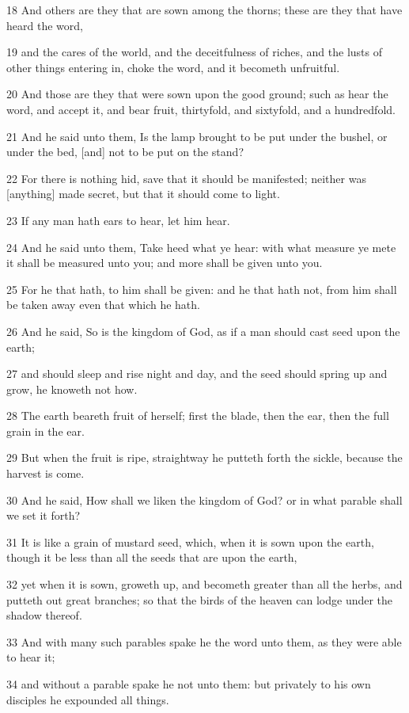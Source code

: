 \par 18 And others are they that are sown among the thorns; these are they that have heard the word,
\par 19 and the cares of the world, and the deceitfulness of riches, and the lusts of other things entering in, choke the word, and it becometh unfruitful.
\par 20 And those are they that were sown upon the good ground; such as hear the word, and accept it, and bear fruit, thirtyfold, and sixtyfold, and a hundredfold.
\par 21 And he said unto them, Is the lamp brought to be put under the bushel, or under the bed, [and] not to be put on the stand?
\par 22 For there is nothing hid, save that it should be manifested; neither was [anything] made secret, but that it should come to light.
\par 23 If any man hath ears to hear, let him hear.
\par 24 And he said unto them, Take heed what ye hear: with what measure ye mete it shall be measured unto you; and more shall be given unto you.
\par 25 For he that hath, to him shall be given: and he that hath not, from him shall be taken away even that which he hath.
\par 26 And he said, So is the kingdom of God, as if a man should cast seed upon the earth;
\par 27 and should sleep and rise night and day, and the seed should spring up and grow, he knoweth not how.
\par 28 The earth beareth fruit of herself; first the blade, then the ear, then the full grain in the ear.
\par 29 But when the fruit is ripe, straightway he putteth forth the sickle, because the harvest is come.
\par 30 And he said, How shall we liken the kingdom of God? or in what parable shall we set it forth?
\par 31 It is like a grain of mustard seed, which, when it is sown upon the earth, though it be less than all the seeds that are upon the earth,
\par 32 yet when it is sown, groweth up, and becometh greater than all the herbs, and putteth out great branches; so that the birds of the heaven can lodge under the shadow thereof.
\par 33 And with many such parables spake he the word unto them, as they were able to hear it;
\par 34 and without a parable spake he not unto them: but privately to his own disciples he expounded all things.

